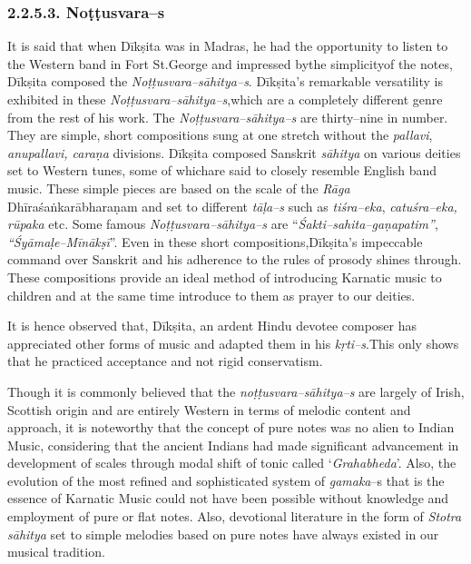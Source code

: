 \vspace{-.3cm}

\subsubsection*{2.2.5.3. Noṭṭusvara–s}

It is said that when Dīkṣita was in Madras, he had the opportunity to listen to the Western band in Fort St.George and impressed bythe simplicityof the notes, Dīkṣita composed the \textit{Noṭṭusvara–sāhitya–s}. Dīkṣita's remarkable versatility is exhibited in these \textit{Noṭṭusvara–sāhitya–s},\break which are a completely different genre from the rest of his work. The \textit{Noṭṭusvara–sāhitya–s} are thirty–nine in number. They are simple, short compositions sung at one stretch without the \textit{pallavi}, \textit{anupallavi, caraṇa} divisions. Dīkṣita composed Sanskrit \textit{sāhitya} on various deities set to Western tunes, some of whichare said to closely resemble English band music. These simple pieces are based on the scale of the \textit{Rāga} Dhīra\-śaṅkarābharaṇam and set to different \textit{tāḷa–s} such as \textit{tiśra–eka}, \textit{catuśra–eka, rūpaka} etc. Some famous \textit{Noṭṭusvara–sāhitya–s} are “\textit{Śakti–sahita–gaṇapatim”}, \textit{“Śyāmaḷe–Mīnākṣī}”. Even in these short compositions,\break Dīkṣita's impeccable command over Sanskrit and his adherence to the rules of prosody shines through. These compositions provide an ideal method of introducing Karnatic music to children and at the same time introduce to them as prayer to our deities.

It is hence observed that, Dīkṣita, an ardent Hindu devotee composer has appreciated other forms of music and adapted them in his \textit{kṛti–s}.\break This only shows that he practiced acceptance and not rigid conservatism.

Though it is commonly believed that the \textit{noṭṭusvara–sāhitya–s} are largely of Irish, Scottish origin and are entirely Western in terms of melodic content and approach, it is noteworthy that the concept of pure notes was no alien to Indian Music, considering that the ancient Indians had made significant advancement in development of scales through modal shift of tonic called ‘\textit{Grahabheda}’. Also, the evolution of the most refined and sophisticated system of \textit{gamaka}–s that is the essence of Karnatic Music could not have been possible without knowledge and employment of pure or flat notes. Also, devotional literature in the form of \textit{Stotra sāhitya} set to simple melodies based on pure notes have always existed in our musical tradition.

